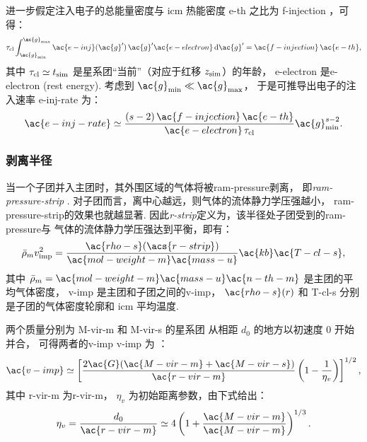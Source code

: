 进一步假定注入电子的总能量密度与 \ac{icm} 热能密度 \ac{e-th} 之比为
\ac{f-injection} \cite{cassano2005}，可得：
\begin{equation}
  \tau_{\R{cl}} \int_{\ac{g}_{\R{min}}}^{\ac{g}_{\R{max}}}
  \ac{e-inj}(\ac{g}') \,\ac{g}'\ac{e-electron} \,\D{\ac{g}'}
    = \ac{f-injection} \,\ac{e-th} ,
\end{equation}
其中
$\tau_{\mathrm{cl}} \simeq t_{\mathrm{sim}}$
是星系团\enquote{当前}（对应于红移 $z_{\mathrm{sim}}$）的年龄，
\ac{e-electron} 是\acl{e-electron} (rest energy).
考虑到 $\ac{g}_{\R{min}} \ll \ac{g}_{\R{\max}}$，
于是可推导出电子的注入速率 \ac{e-inj-rate} 为：
\begin{equation}
  \label{eq:injrate}
  \ac{e-inj-rate} \simeq
    \frac{(s-2)\,\ac{f-injection}\,\ac{e-th}}{
      \ac{e-electron}\,\tau_{\R{cl}}} \ac{g}_{\R{min}}^{s-2} .
\end{equation}

\subsubsection{剥离半径}

当一个子团并入主团时，其外围区域的气体将被\ac{ram-pressure}剥离，
即\emph{\acf{ram-pressure-strip}} \cite{gunn1972}.
对子团而言，离中心越远，则气体的流体静力学压强越小，
\ac{ram-pressure-strip}的效果也就越显著.
因此\emph{\acf{r-strip}}定义为，该半径处子团受到的\ac{ram-pressure}与
气体的流体静力学压强达到平衡\cite{cassano2005}，即有：
\begin{equation}
  \label{eq:rs-eqp}
  \bar{\rho}_m v_{\R{imp}}^2
    = \frac{\ac{rho-s}(\acs{r-strip})}{\ac{mol-weight-m} \ac{mass-u}}
      \ac{kb} \ac{T-cl-s} ,
\end{equation}
其中
$\bar{\rho}_m = \ac{mol-weight-m} \ac{mass-u} \ac{n-th-m}$
是主团的平均气体密度，
\ac{v-imp} 是主团和子团之间的\acl{v-imp}，
$\ac{rho-s}(r)$ 和 \ac{T-cl-s} 分别是子团的气体密度轮廓和 \ac{icm} 平均温度.

两个质量分别为 \ac{M-vir-m} 和 \ac{M-vir-s} 的星系团
从相距 $d_0$ 的地方以初速度 0 开始并合，
可得两者的\acl{v-imp} \ac{v-imp} 为 \cite{sarazin2002,cassano2005}：
\begin{equation}
  \label{eq:v-imp}
  \ac{v-imp} \simeq \left[
    \frac{2 \ac{G} (\ac{M-vir-m} + \ac{M-vir-s})}{\ac{r-vir-m}}
    \left( 1 - \frac{1}{\eta_v} \right)\right]^{1/2} ,
\end{equation}
其中
\ac{r-vir-m} 为\acl{r-vir-m}，
$\eta_v$ 为初始距离参数，由下式给出：
\begin{equation}
  \eta_v
    = \frac{d_0}{\ac{r-vir-m}}
    \simeq 4 \left( 1 + \frac{\ac{M-vir-m}}{\ac{M-vir-m}} \right)^{1/3} .
\end{equation}

